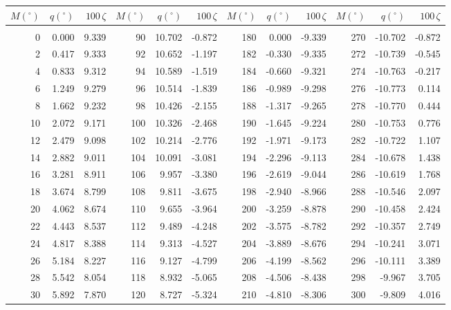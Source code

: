 \newpage
\begin{table}\centering
\small{ \begin{tabular}{rrr|rrr|rrr|rrr}
$M(^\circ)$ & $q(^\circ)$  & $100\,\zeta$ & $M(^\circ)$ & $q(^\circ)$  & $100\,\zeta$ & $M(^\circ)$ & $q(^\circ)$  & $100\,\zeta$& $M(^\circ)$ & $q(^\circ)$  & $100\,\zeta$\\\hline
&&&&&&&&&&&\\[-1.75ex]
 0 &   0.000 &  9.339 &  90 &  10.702 & -0.872 & 180 &   0.000 & -9.339 & 270 & -10.702 & -0.872\\
  2 &   0.417 &  9.333 &  92 &  10.652 & -1.197 & 182 &  -0.330 & -9.335 & 272 & -10.739 & -0.545\\
  4 &   0.833 &  9.312 &  94 &  10.589 & -1.519 & 184 &  -0.660 & -9.321 & 274 & -10.763 & -0.217\\
  6 &   1.249 &  9.279 &  96 &  10.514 & -1.839 & 186 &  -0.989 & -9.298 & 276 & -10.773 &  0.114\\
  8 &   1.662 &  9.232 &  98 &  10.426 & -2.155 & 188 &  -1.317 & -9.265 & 278 & -10.770 &  0.444\\
 10 &   2.072 &  9.171 & 100 &  10.326 & -2.468 & 190 &  -1.645 & -9.224 & 280 & -10.753 &  0.776\\
 12 &   2.479 &  9.098 & 102 &  10.214 & -2.776 & 192 &  -1.971 & -9.173 & 282 & -10.722 &  1.107\\
 14 &   2.882 &  9.011 & 104 &  10.091 & -3.081 & 194 &  -2.296 & -9.113 & 284 & -10.678 &  1.438\\
 16 &   3.281 &  8.911 & 106 &   9.957 & -3.380 & 196 &  -2.619 & -9.044 & 286 & -10.619 &  1.768\\
 18 &   3.674 &  8.799 & 108 &   9.811 & -3.675 & 198 &  -2.940 & -8.966 & 288 & -10.546 &  2.097\\
 20 &   4.062 &  8.674 & 110 &   9.655 & -3.964 & 200 &  -3.259 & -8.878 & 290 & -10.458 &  2.424\\
 22 &   4.443 &  8.537 & 112 &   9.489 & -4.248 & 202 &  -3.575 & -8.782 & 292 & -10.357 &  2.749\\
 24 &   4.817 &  8.388 & 114 &   9.313 & -4.527 & 204 &  -3.889 & -8.676 & 294 & -10.241 &  3.071\\
 26 &   5.184 &  8.227 & 116 &   9.127 & -4.799 & 206 &  -4.199 & -8.562 & 296 & -10.111 &  3.389\\
 28 &   5.542 &  8.054 & 118 &   8.932 & -5.065 & 208 &  -4.506 & -8.438 & 298 &  -9.967 &  3.705\\
 30 &   5.892 &  7.870 & 120 &   8.727 & -5.324 & 210 &  -4.810 & -8.306 & 300 &  -9.809 &  4.016\\

\end{tabular}}
\end{table}
